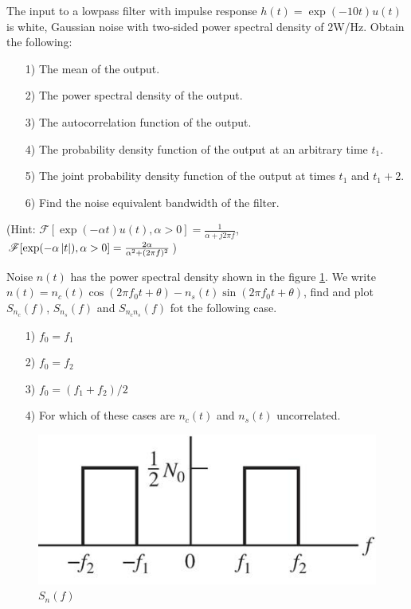 \documentclass{assignment}
\begin{document}
\begin{prob}
    The input to a lowpass filter with impulse response $h(t)=\exp(-10t)u(t)$ is white, Gaussian noise with two-sided power spectral density of $2$W/Hz. Obtain the following:
    \begin{itemize}
        \item[1)] The mean of the output.
        \item[2)] The power spectral density of the output.
        \item[3)] The autocorrelation function of the output.
        \item[4)] The probability density function of the output at an arbitrary time $t_1$.
        \item[5)] The joint probability density function of the output at times $t_1$ and $t_1+2$.
        \item[6)] Find the noise equivalent bandwidth of the filter.
    \end{itemize}
    (Hint: $\mathscr{F}[\exp(-\alpha t)u(t),\alpha>0]=\frac{1}{\alpha+j2\pi f}$, $\mathscr{F}[\exp(-\alpha\left\lvert t\right\rvert),\alpha>0]=\frac{2\alpha}{\alpha^2+(2\pi f)^2}$)
\end{prob}
\begin{sol}
    
\end{sol}

\begin{prob}
    Noise $n(t)$ has the power spectral density shown in the figure \ref{figure1}. We write $n(t)=n_c(t)\cos(2\pi f_0t+\theta)-n_s(t)\sin(2\pi f_0t+\theta)$, find and plot $S_{n_c}(f)$, $S_{n_s}(f)$ and $S_{n_cn_s}(f)$ fot the following case.
    \begin{itemize}
        \item[1)] $f_0=f_1$
        \item[2)] $f_0=f_2$
        \item[3)] $f_0=(f_1+f_2)/2$
        \item[4)] For which of these cases are $n_c(t)$ and $n_s(t)$ uncorrelated.
    \end{itemize}
    \begin{figure}[h]
        \centering
        \includegraphics[width=.5\textwidth]{Figure1.jpg}
        \caption{$S_n(f)$}\label{figure1}
    \end{figure}
\end{prob}
\begin{sol}
    
\end{sol}
\end{document}
